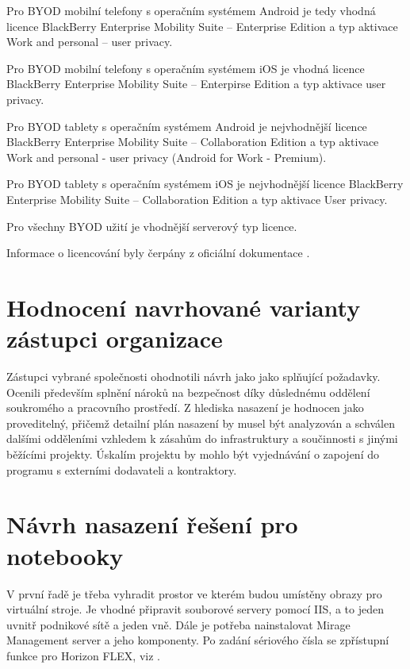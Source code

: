 Pro BYOD mobilní telefony s operačním systémem Android je tedy vhodná licence BlackBerry Enterprise Mobility Suite -- Enterprise Edition a typ aktivace Work and personal -- user privacy.

Pro BYOD mobilní telefony s operačním systémem iOS je vhodná licence BlackBerry Enterprise Mobility Suite -- Enterpirse Edition a typ aktivace user privacy.

Pro BYOD tablety s operačním systémem Android je nejvhodnější licence BlackBerry Enterprise Mobility Suite -- Collaboration Edition a typ aktivace Work and personal - user privacy (Android for Work - Premium).

Pro BYOD tablety s operačním systémem iOS je nejvhodnější licence BlackBerry Enterprise Mobility Suite -- Collaboration Edition a typ aktivace User privacy.

Pro všechny BYOD užití je vhodnější serverový typ licence.

Informace o licencování byly čerpány z oficiální dokumentace \cite{BBLicence}.

\section{Hodnocení navrhované varianty zástupci organizace}
Zástupci vybrané společnosti ohodnotili návrh jako jako splňující požadavky. Ocenili především splnění nároků na bezpečnost díky důslednému oddělení soukromého a pracovního prostředí. Z hlediska nasazení je hodnocen jako proveditelný, přičemž detailní plán nasazení by musel být analyzován a schválen dalšími odděleními vzhledem k zásahům do infrastruktury a součinnosti s jinými běžícími projekty. 
Úskalím projektu by mohlo být vyjednávání o zapojení do programu s externími dodavateli a kontraktory.

\section{Návrh nasazení řešení pro notebooky}

V první řadě je třeba vyhradit prostor ve kterém budou umístěny obrazy pro virtuální stroje. Je vhodné připravit souborové servery pomocí IIS, a to jeden uvnitř podnikové sítě a jeden vně. Dále je potřeba nainstalovat Mirage Management server a jeho komponenty. Po zadání sériového čísla se zpřístupní funkce pro Horizon FLEX, viz \cite{FlexDeployment}. 

